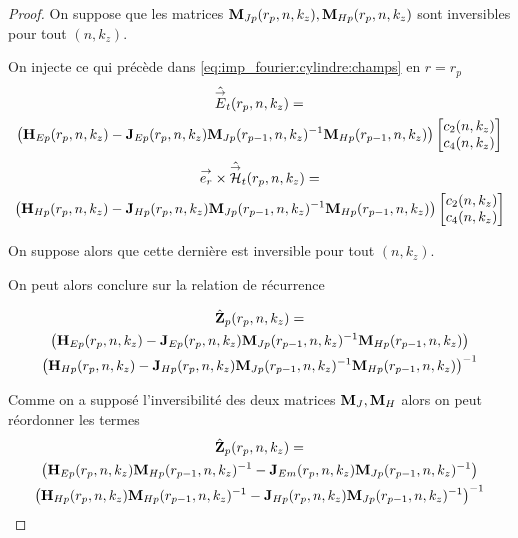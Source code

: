 \begin{proof}
      On suppose que les matrices \(\mathbf{M}_{Jp}(r_p,n,k_z), \mathbf{M}_{Hp}(r_p,n,k_z)\) sont inversibles pour tout \((n,k_z)\).

      On injecte ce qui précède dans \eqref{eq:imp_fourier:cylindre:champs} en \(r = r_{p}\)
      \begin{multline}
        \hat{{\overset{\rightarrow}{E}}}_t(r_p,n,k_z) = \\
        \left(\mathbf{H}_{Ep}(r_{p},n,k_z) - \mathbf{J}_{Ep}(r_{p},n,k_z)\mathbf{M}_{Jp}(r_{p-1},n,k_z)^{-1}\mathbf{M}_{Hp}(r_{p-1},n,k_z)\right)
        \begin{bmatrix}
          c_2(n,k_z) \\
          c_4(n,k_z)
        \end{bmatrix}
      \end{multline}        
      \begin{multline}
        {\overset{\rightarrow}{e_r}}\times\hat{{\overset{\rightarrow}{\mathcal{H}}}}_t(r_p,n,k_z) = \\
        \left(\mathbf{H}_{Hp}(r_{p},n,k_z) - \mathbf{J}_{Hp}(r_{p},n,k_z)\mathbf{M}_{Jp}(r_{p-1},n,k_z)^{-1}\mathbf{M}_{Hp}(r_{p-1},n,k_z) \right)
        \begin{bmatrix}
          c_2(n,k_z) \\
          c_4(n,k_z)
        \end{bmatrix}
      \end{multline}

      On suppose alors que cette dernière est inversible pour tout \((n,k_z)\).

      On peut alors conclure sur la relation de récurrence

      \begin{multline}
        \hat{\mathbf{Z}}_{p}(r_p,n,k_z) =\\
          \left(\mathbf{H}_{Ep}(r_p,n,k_z) - \mathbf{J}_{Ep}(r_p,n,k_z)\mathbf{M}_{Jp}(r_{p-1},n,k_z)^{-1}\mathbf{M}_{Hp}(r_{p-1},n,k_z)\right) \\
          \left(\mathbf{H}_{Hp}(r_p,n,k_z) - \mathbf{J}_{Hp}(r_p,n,k_z)\mathbf{M}_{Jp}(r_{p-1},n,k_z)^{-1}\mathbf{M}_{Hp}(r_{p-1},n,k_z)\right)^{-1}
      \end{multline}

      Comme on a supposé l'inversibilité des deux matrices \(\mathbf{M}_J, \mathbf{M}_H\) alors on peut réordonner les termes
      \begin{multline}
        \hat{\mathbf{Z}}_{p}(r_p,n,k_z) =\\
          \left(\mathbf{H}_{Ep}(r_p,n,k_z)\mathbf{M}_{Hp}(r_{p-1},n,k_z)^{-1} - \mathbf{J}_{Em}(r_p,n,k_z)\mathbf{M}_{Jp}(r_{p-1},n,k_z)^{-1}\right) \\
          \left(\mathbf{H}_{Hp}(r_p,n,k_z)\mathbf{M}_{Hp}(r_{p-1},n,k_z)^{-1} - \mathbf{J}_{Hp}(r_p,n,k_z)\mathbf{M}_{Jp}(r_{p-1},n,k_z)^{-1}\right)^{-1}
      \end{multline}

    \end{proof}


